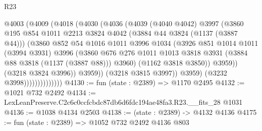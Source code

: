 \begin{lexlean}{R23}
\begin{coremodule}
                            @4003
                              (@4009
                                (@4018
                                  (@4030
                                    (@4036
                                      (@4039
                                        (@4040 @4042)
                                        @3997
                                        (@3860
                                          @195
                                          @854
                                          @1011
                                          @2213
                                          @3824
                                          @4042
                                          (@3884 @44 @3824 (@1137 (@3887 @44)))
                                          (@3860
                                            @852
                                            @54
                                            @1016
                                            @1011
                                            @3996
                                            @1034
                                            (@3926
                                              @851
                                              @1014
                                              @1011
                                              (@3994 @3931)
                                              @3996
                                              (@3860
                                                @676
                                                @276
                                                @1011
                                                @1013
                                                @3818
                                                @3931
                                                (@3884 @88 @3818 (@1137 (@3887 @88)))
                                                @3960)
                                              (@1162 @3818 @3850))
                                            @3959))
                                        (@3218 @3824 @3996))
                                      @3959))
                                  (@3218 @3815 @3997))
                                @3959)
                              (@3232 @3998))))))))))))))
@4130 := fun (state : @2389) => @1170 @2495
@4132 := @1021 @732 @2492
@4134 := LexLeanPreserve.C2c6c0ccfcbdc87db6d6fdc194ae48fa3.R23.__fits_28 @1031
@4136 := @1038 @4134 @2503
@4138 := (state : @2389) -> @4132 @4136
@4175 := fun (state : @2389) =>
  @1052
    @732
    @2492
    @4136
    @803

\end{coremodule}
\end{lexlean}
